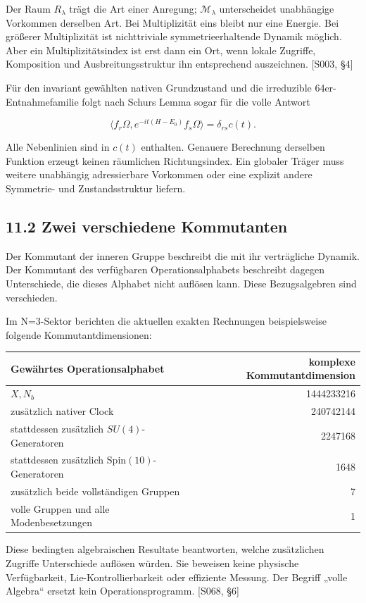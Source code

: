 Der Raum \(R_\lambda\) trägt die Art einer Anregung;
\(\mathcal M_\lambda\) unterscheidet unabhängige Vorkommen derselben
Art. Bei Multiplizität eins bleibt nur eine Energie. Bei größerer
Multiplizität ist nichttriviale symmetrieerhaltende Dynamik möglich.
Aber ein Multiplizitätsindex ist erst dann ein Ort, wenn lokale
Zugriffe, Komposition und Ausbreitungsstruktur ihn entsprechend
auszeichnen. {[}S003, §4{]}

Für den invariant gewählten nativen Grundzustand und die irreduzible
64er-Entnahmefamilie folgt nach Schurs Lemma sogar für die volle Antwort

\[\langle f_r\Omega,e^{-it(H-E_0)}f_s\Omega\rangle
=\delta_{rs}c(t).\]

Alle Nebenlinien sind in \(c(t)\) enthalten. Genauere Berechnung
derselben Funktion erzeugt keinen räumlichen Richtungsindex. Ein
globaler Träger muss weitere unabhängig adressierbare Vorkommen oder
eine explizit andere Symmetrie- und Zustandsstruktur liefern.

\subsection{11.2 Zwei verschiedene
Kommutanten}\label{zwei-verschiedene-kommutanten}

Der Kommutant der inneren Gruppe beschreibt die mit ihr verträgliche
Dynamik. Der Kommutant des verfügbaren Operationsalphabets beschreibt
dagegen Unterschiede, die dieses Alphabet nicht auflösen kann. Diese
Bezugsalgebren sind verschieden.

Im N=3-Sektor berichten die aktuellen exakten Rechnungen beispielsweise
folgende Kommutantdimensionen:

{\def\LTcaptype{none} %
\begin{longtable}[]{@{}lr@{}}
\toprule\noalign{}
Gewährtes Operationsalphabet & komplexe Kommutantdimension \\
\midrule\noalign{}
\endhead
\bottomrule\noalign{}
\endlastfoot
\(X,N_b\) & 1444233216 \\
zusätzlich nativer Clock & 240742144 \\
stattdessen zusätzlich \(SU(4)\)-Generatoren & 2247168 \\
stattdessen zusätzlich \(\mathrm{Spin}(10)\)-Generatoren & 1648 \\
zusätzlich beide vollständigen Gruppen & 7 \\
volle Gruppen und alle Modenbesetzungen & 1 \\
\end{longtable}
}

Diese bedingten algebraischen Resultate beantworten, welche zusätzlichen
Zugriffe Unterschiede auflösen würden. Sie beweisen keine physische
Verfügbarkeit, Lie-Kontrollierbarkeit oder effiziente Messung. Der
Begriff „volle Algebra`` ersetzt kein Operationsprogramm. {[}S068, §6{]}

